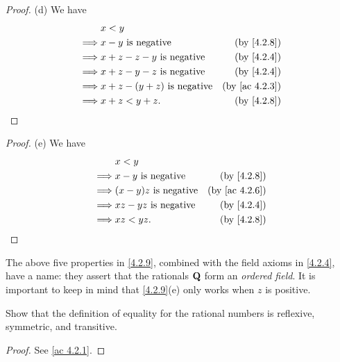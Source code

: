 \begin{proof}{(d)}
  We have
  \begin{align*}
             & x < y                                                             \\
    \implies & x - y \text{ is negative}           & \text{(by \cref{4.2.8})}    \\
    \implies & x + z - z - y \text{ is negative}   & \text{(by \cref{4.2.4})}    \\
    \implies & x + z - y - z \text{ is negative}   & \text{(by \cref{4.2.4})}    \\
    \implies & x + z - (y + z) \text{ is negative} & \text{(by \cref{ac 4.2.3})} \\
    \implies & x + z < y + z.                      & \text{(by \cref{4.2.8})}
  \end{align*}
\end{proof}

\begin{proof}{(e)}
  We have
  \begin{align*}
             & x < y                                                      \\
    \implies & x - y \text{ is negative}    & \text{(by \cref{4.2.8})}    \\
    \implies & (x - y)z \text{ is negative} & \text{(by \cref{ac 4.2.6})} \\
    \implies & xz - yz \text{ is negative}  & \text{(by \cref{4.2.4})}    \\
    \implies & xz < yz.                     & \text{(by \cref{4.2.8})}
  \end{align*}
\end{proof}

\begin{remark}\label{4.2.10}
  The above five properties in \cref{4.2.9}, combined with the field axioms in \cref{4.2.4}, have a name:
  they assert that the rationals \(\mathbf{Q}\) form an \emph{ordered field}.
  It is important to keep in mind that \cref{4.2.9}(e) only works when \(z\) is positive.
\end{remark}

\exercisesection

\begin{exercise}\label{ex 4.2.1}
  Show that the definition of equality for the rational numbers is reflexive, symmetric, and transitive.
\end{exercise}

\begin{proof}
  See \cref{ac 4.2.1}.
\end{proof}

